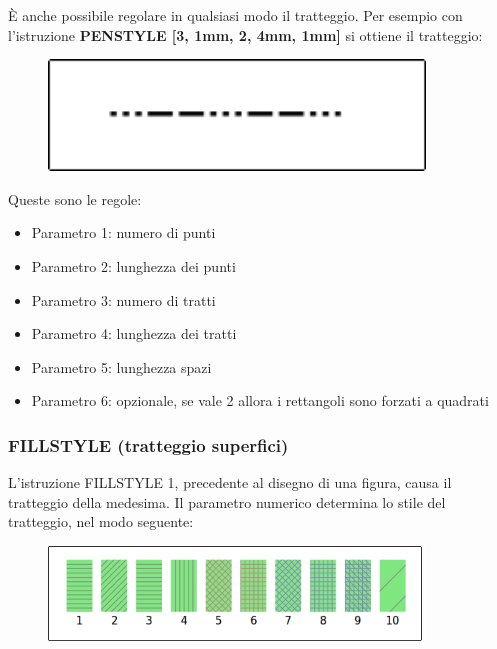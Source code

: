 \vskip 1cm

È anche possibile regolare in qualsiasi modo il tratteggio. Per esempio con l'istruzione \textbf{PENSTYLE [3, 1mm, 2, 4mm, 1mm]} si ottiene il tratteggio:

\vskip 1cm

\begin{figure}[H]
   \centering
   \includegraphics[width=10.0cm,trim=8 8 8 8,clip]{./images/disegnare/disegnare-39.png}
   \label{dis-40}
\end{figure}

\vskip 1cm

Queste sono le regole: 

\begin{itemize}
\item Parametro 1: numero di punti
\item Parametro 2: lunghezza dei punti
\item Parametro 3: numero di tratti
\item Parametro 4: lunghezza dei tratti
\item Parametro 5: lunghezza spazi
\item Parametro 6: opzionale, se vale 2 allora i rettangoli sono forzati a quadrati
\end{itemize}

\subsubsection{FILLSTYLE (tratteggio superfici)}

L'istruzione FILLSTYLE 1, precedente al disegno di una figura, causa il tratteggio della medesima. Il parametro numerico determina lo stile del tratteggio, nel modo seguente:


\vskip 1cm

\begin{figure}[H]
   \centering
   \includegraphics[width=10.0cm,trim=8 8 8 8,clip]{./images/disegnare/disegnare-40.png}
   \label{dis-41}
\end{figure}

